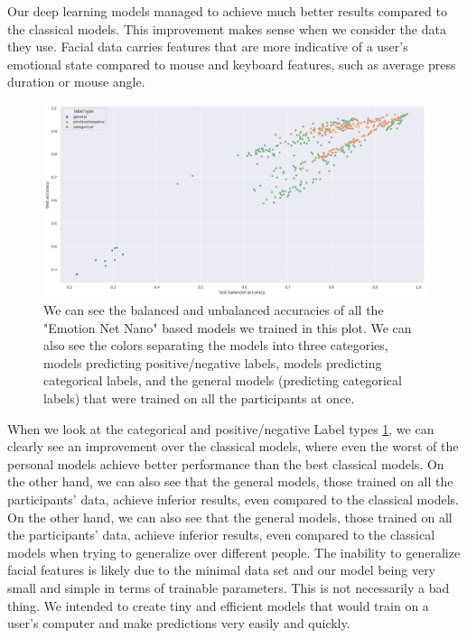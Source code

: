 \documentclass[../main.tex]{subfiles}
\begin{document}
    Our deep learning models managed to achieve much better results compared to the classical models. 
    This improvement makes sense when we consider the data they use. Facial data carries features that are more 
    indicative of a user's emotional state compared to mouse and keyboard features, such as average press duration or mouse angle.

    \begin{figure}[!htp]
        \centering
        \includegraphics[width=14cm]{figures/results/nn_acc}   
        \caption{We can see the balanced and unbalanced accuracies of all the "Emotion Net Nano" based models we trained in this plot.
        We can also see the colors separating the models into three categories, models predicting positive/negative labels, models predicting
        categorical labels, and the general models (predicting categorical labels) that were trained on all the participants at once.}
        \label{fig:nn_acc} 
    \end{figure}

    When we look at the categorical and positive/negative Label types \ref{fig:nn_acc}, we can clearly see an improvement over 
    the classical models, where even the worst of the personal models achieve better performance than the best classical models.
    On the other hand, we can also see that the general models, those trained on all the participants' data, achieve inferior results, 
    even compared to the classical models. On the other hand, we can also see that the general models, 
    those trained on all the participants' data, achieve inferior results, even compared to the classical models when trying 
    to generalize over different people. The inability to generalize facial features is likely due to the minimal data 
    set and our model being very small and simple in terms of trainable parameters. This is not necessarily a bad thing. 
    We intended to create tiny and efficient models that would train on a user's computer and make predictions very easily and quickly.
\end{document}
